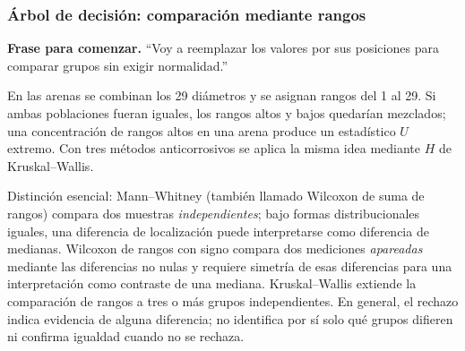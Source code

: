 \documentclass[11pt,a4paper]{article}
\newcommand{\inicio}[1]{\textbf{Frase para comenzar.} ``#1''\par}
\begin{document}
\subsubsection{Árbol de decisión: comparación mediante rangos}
\begin{center}\end{center}

\inicio{Voy a reemplazar los valores por sus posiciones para comparar grupos sin exigir normalidad.}
\begin{idea}
En las arenas se combinan los 29 diámetros y se asignan rangos del 1 al 29. Si ambas poblaciones fueran iguales, los rangos altos y bajos quedarían mezclados; una concentración de rangos altos en una arena produce un estadístico $U$ extremo. Con tres métodos anticorrosivos se aplica la misma idea mediante $H$ de Kruskal--Wallis.
\end{idea}

\begin{importante}
Distinción esencial: Mann--Whitney (también llamado Wilcoxon de suma de rangos) compara dos muestras \emph{independientes}; bajo formas distribucionales iguales, una diferencia de localización puede interpretarse como diferencia de medianas. Wilcoxon de rangos con signo compara dos mediciones \emph{apareadas} mediante las diferencias no nulas y requiere simetría de esas diferencias para una interpretación como contraste de una mediana. Kruskal--Wallis extiende la comparación de rangos a tres o más grupos independientes. En general, el rechazo indica evidencia de alguna diferencia; no identifica por sí solo qué grupos difieren ni confirma igualdad cuando no se rechaza.
\end{importante}
\end{document}
